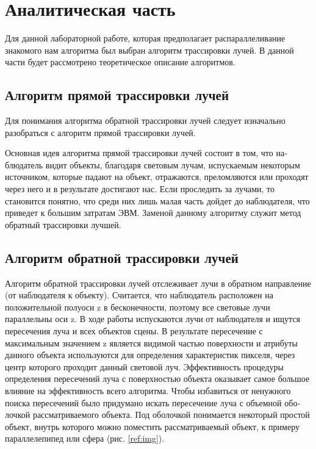 \chapter{Аналитическая часть}





Для данной лабораторной работе, которая предполагает распараллеливание
знакомого нам алгоритма был выбран алгоритм трассировки лучей.
В данной части будет рассмотрено теоретическое описание алгоритмов.

\section{Алгоритм прямой трассировки лучей}

Для понимания алгоритма обратной трассировки лучей следует изначально разобраться с
алгоритм прямой трассировки лучей.

Основная идея алгоритма прямой трассировки лучей состоит в том, что на­блюдатель
видит объекты, благодаря световым лучам, испускаемым некоторым ис­точником,
которые падают на объект, отражаются, преломляются или проходят че­рез
него и в результате достигают нас. Если проследить за лучами, то становится
понятно, что среди них лишь малая часть дойдет до наблюдателя, что приведет к
большим затратам ЭВМ. Заменой данному алгоритму служит метод обратный трас­сировки лучшей.

\section{Алгоритм обратной трассировки лучей}

Алгоритм обратной трассировки лучей отслеживает лучи в обратном направ­ление (от наблюдателя к объекту).
Считается, что наблюдатель расположен на положительной полуоси z в бес­конечности,
поэтому все световые лучи параллельны оси z. В ходе работы испуска­ются
лучи от наблюдателя и ищутся пересечения луча и всех объектов сцены.
В результате пересечение с максимальным значением z является видимой частью
поверхности и атрибуты данного объекта используются для определения характери­стик
пикселя, через центр которого проходит данный световой луч. Эффективность
процедуры определения пересечений луча с поверхностью объекта оказывает самое
большое влияние на эффективность всего алгоритма. Чтобы избавиться от ненуж­ного
поиска пересечений было придумано искать пересечение луча с объемной обо­лочкой
рассматриваемого объекта. Под оболочкой понимается некоторый простой
объект, внутрь которого можно поместить рассматриваемый объект, к примеру па­раллелепипед или сфера (рис. \ref{ref:img}).

